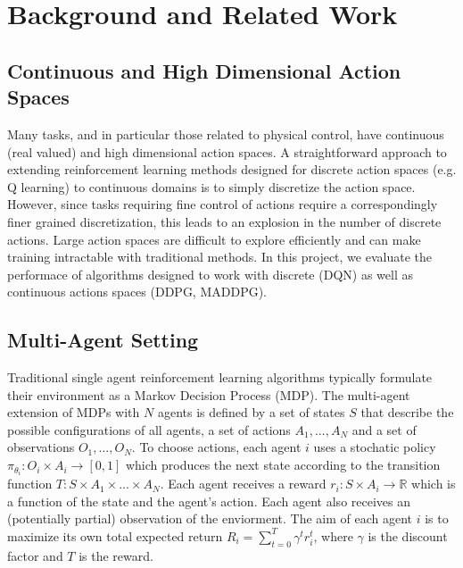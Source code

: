 
\section{Background and Related Work}
\label{sec:background}

\subsection{Continuous and High Dimensional Action Spaces}

Many tasks, and in particular those related to physical control, have continuous (real valued) and high dimensional action spaces. A straightforward approach to extending reinforcement learning methods designed for discrete action spaces (e.g. Q learning) to continuous domains is to simply discretize the action space. However, since tasks requiring fine control of actions require a correspondingly finer grained discretization, this leads to an explosion in the number of discrete actions. Large action spaces are difficult to explore efficiently and can make training intractable with traditional methods. In this project, we evaluate the performace of algorithms designed to work with discrete (DQN) as well as continuous actions spaces (DDPG, MADDPG). 

\subsection{Multi-Agent Setting}

Traditional single agent reinforcement learning algorithms typically formulate their environment as a Markov Decision Process (MDP). The multi-agent extension of MDPs with $N$ agents is defined by a set of states $S$ that describe the possible configurations of all agents, a set of actions $A_1, ..., A_N$ and a set of observations $O_1, ..., O_N$. To choose actions, each agent $i$ uses a stochatic policy $\pi_{\theta_i}: O_i \times A_i \rightarrow [0, 1]$ which produces the next state according to the transition function $T: S \times A_1 \times ... \times A_N$. Each agent receives a reward $r_i: S \times A_i \rightarrow \mathbb{R}$ which is a function of the state and the agent's action. Each agent also receives an (potentially partial) observation of the enviorment. The aim of each agent $i$ is to maximize its own total expected return $R_i = \sum_{t=0}^{T} \gamma^{t}r_i^{t}$, where $\gamma$ is the discount factor and $T$ is the reward.


